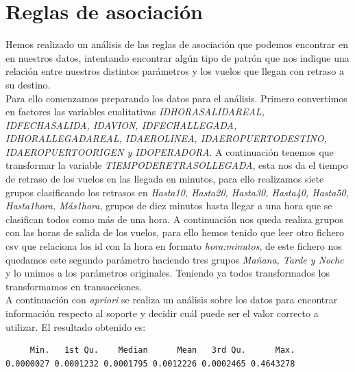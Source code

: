 \documentclass{article}
\begin{document}
\section{Reglas de asociación}

Hemos realizado un análisis de las reglas de asociación que podemos encontrar en en nuestros datos, intentando encontrar algún tipo de patrón que nos indique una relación entre nuestros distintos parámetros y los vuelos que llegan con retraso a su destino.\\

Para ello comenzamos preparando los datos para el análisis. Primero convertimos en factores las variables cualitativas \textit{IDHORASALIDAREAL, IDFECHASALIDA, IDAVION, IDFECHALLEGADA, IDHORALLEGADAREAL, IDAEROLINEA, IDAEROPUERTODESTINO, IDAEROPUERTOORIGEN y IDOPERADORA}. A continuación tenemos que transformar la variable \textit{TIEMPODERETRASOLLEGADA}, esta nos da el tiempo de retraso de los vuelos en las llegada en minutos, para ello realizamos siete grupos clasificando los retrasos en \textit{Hasta10, Hasta20, Hasta30, Hasta40, Hasta50, Hasta1hora, Más1hora}, grupos de diez minutos hasta llegar a una hora que se clasifican todos como más de una hora. A continuación nos queda realiza grupos con las horas de salida de los vuelos, para ello hemos tenido que leer otro fichero csv que relaciona los id con la hora en formato \textit{hora:minutos}, de este fichero nos quedamos este segundo parámetro haciendo tres grupos \textit{Mañana, Tarde y Noche} y lo unimos a los parámetros originales. Teniendo ya todos transformados los transformamos en transacciones. \\

A continuación con \textit{apriori} se realiza un análisis sobre los datos para encontrar información respecto al soporte y decidir cuál puede ser el valor correcto a utilizar. El resultado obtenido es:\\
\begin{lstlisting}
     Min.   1st Qu.    Median      Mean   3rd Qu.      Max. 
0.0000027 0.0001232 0.0001795 0.0012226 0.0002465 0.4643278 
\end{lstlisting}
\end{document}
